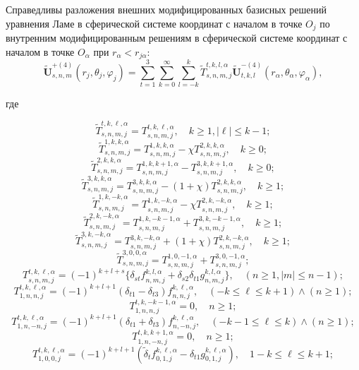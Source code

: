 \begin{theorem}
Справедливы разложения внешних модифицированных базисных решений уравнения Ламе в сферической системе координат с началом в точке $O_j$ по внутренним модифицированным решениям в сферической системе координат с началом в точке $O_\alpha$ при $r_\alpha<r_{j\alpha}$:
\begin{equation}
\mathbf{\tilde U}_{s,n,m}^{+(4)}(r_j,\theta_j,\varphi_j)=\sum\limits_{t=1}^3\sum\limits_{k=0}^\infty\sum\limits_{l=-k}^k\tilde T_{s,n,m,j}^{t,k,l,\alpha}\mathbf{\tilde U}_{t,k,l}^{-(4)}(r_\alpha,\theta_\alpha,\varphi_\alpha),
\label{eq:1:99t}
\end{equation}

\noindent где

\begin{equation*}
\tilde T_{s,n,m,j}^{t,k,\ell ,\alpha } = T_{s,n,m,j}^{t,k,\ell ,\alpha },\quad k\ge 1, |\ell|\le k-1;
\end{equation*}
\begin{equation*}
\tilde T_{s,n,m,j}^{1,k,k,\alpha } = T_{s,n,m,j}^{1,k,k,\alpha } - \chi T_{s,n,m,j}^{2,k,k,\alpha },\quad k\ge 0;
\end{equation*}
\[\tilde T_{s,n,m,j}^{2,k,k,\alpha } = T_{s,n,m,j}^{1,k,k + 1,\alpha } - T_{s,n,m,j}^{3,k,k + 1,\alpha },\quad k\ge 0;\]
\[\tilde T_{s,n,m,j}^{3,k,k,\alpha } = T_{s,n,m,j}^{3,k,k,\alpha } - (1 + \chi )T_{s,n,m,j}^{2,k,k,\alpha },\quad k\ge 1;\]
\[\tilde T_{s,n,m,j}^{1,k, - k,\alpha } = T_{s,n,m,j}^{1,k, - k,\alpha } - \chi T_{s,n,m,j}^{2,k, - k,\alpha },\quad k\ge 1;\]
\[\tilde T_{s,n,m,j}^{2,k, - k,\alpha } = T_{s,n,m,j}^{1,k, - k - 1,\alpha } + T_{s,n,m,j}^{3,k, - k - 1,\alpha },\quad k\ge 1;\]
\[\tilde T_{s,n,m,j}^{3,k, - k,\alpha } = T_{s,n,m,j}^{3,k, - k,\alpha } + (1 + \chi )T_{s,n,m,j}^{2,k, - k,\alpha },\quad k\ge 1;\]
\[\tilde T_{s,n,m,j}^{3,0,0,\alpha } = T_{s,n,m,j}^{1,0, - 1,\alpha } + T_{s,n,m,j}^{3,0, - 1,\alpha };\]
\[T_{s,n,m,j}^{t,k,\ell ,\alpha } = (-1)^{k+l+s}\bigg\{\delta_{st}f_{n,m,j}^{k,l,\alpha}+\delta_{s2}\delta_{t1}g_{n,m,j}^{k,l,\alpha}\bigg\},\quad (n\ge 1, |m|\le n-1);\]
\[T_{1,n,n,j}^{t,k,\ell ,\alpha } = (-1)^{k+l+1}({\delta _{t1}} - {\delta _{t3}}){f}_{n,n,j}^{k,\ell ,\alpha },\quad( - k \le \ell  \le k + 1) \wedge (n \ge 1);\]
\[T_{1,n,n,j}^{t,k, - k - 1,\alpha } = 0,\quad n\ge 1;\]
\[T_{1,n, - n,j}^{t,k,\ell ,\alpha } = (-1)^{k+l+1}({\delta _{t1}} + {\delta _{t3}}){f}_{n, - n,j}^{k,\ell ,\alpha },\quad( - k - 1 \le \ell  \le k) \wedge (n \ge 1);\]
\[T_{1,n,-n,j}^{t,k,k+1,\alpha } = 0,\quad n\ge 1;\]
\[T_{1,0,0,j}^{t,k,\ell ,\alpha } = (-1)^{k+l+1}({\tilde \delta _t}{f}_{0,1,j}^{k,\ell ,\alpha } - {\delta _{t1}}{g}_{0,1,j}^{k,\ell ,\alpha }),\quad 1 - k \le \ell  \le k + 1;\]

\end{theorem}
